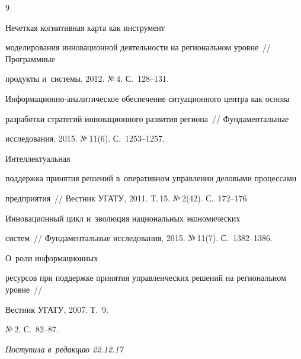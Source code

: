 {{\begin{thebibliography}{9}


 Нечеткая когнитивная карта как инструмент 


моделирования инновационной деятельности на региональном уровне~/\!\!/ Программные 


продукты и~сис\-те\-мы, 2012. №\,4. С.~128--131.






Ин\-фор\-ма\-ци\-он\-но-ана\-ли\-ти\-че\-ское обеспечение ситуационного центра как основа 


разработки стратегий инновационного развития региона~/\!\!/ Фундаментальные 


исследования, 2015. №\,11(6). С.~1253--1257.




 Интеллектуальная 


поддержка принятия решений в~оперативном управ\-ле\-нии деловыми процессами 


предприятия~/\!\!/ Вестник УГАТУ, 2011. Т.\,15. №\,2(42). С.~172--176.




 Инновационный цикл и~эволюция национальных экономических  


сис\-тем~/\!\!/ Фундаментальные исследования, 2015. №\,11(7). С.~1382--1386.




 О~роли информационных 


ресурсов при поддержке принятия управ\-лен\-че\-ских решений на региональном уровне~/\!\!/ 


Вестник УГАТУ, 2007. Т.~9. 


№\,2. С.~82--87.


        \end{thebibliography}


} }








\vspace*{-9pt}





\hfill{\small\textit{Поступила в~редакцию 22.12.17}}














